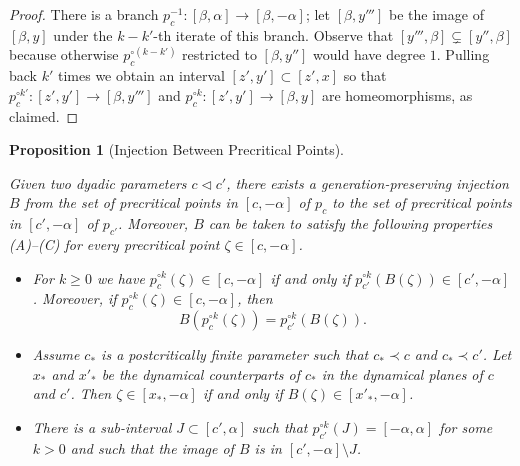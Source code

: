 \documentclass[12pt]{amsart}
\newcommand{\0}{\texttt{0}}
\newcommand{\1}{\texttt{1}}
\newtheorem{proposition}[theorem]{Proposition}
\theoremstyle{definition}
\numberwithin{equation}{section}
\newcommand{\lineclear}{\rule{0pt}{2pt}\newline}
\begin{document}
\begin{proof}
There is a branch $p_c^{-1}\colon[\beta,\alpha]\to[\beta,-\alpha]$; let $[\beta,y''']$ be the image of $[\beta,y]$ under the $k-k'$-th iterate of this branch. 
Observe that $[y''',\beta]\subsetneq[y'',\beta]$  because otherwise $p_c^{\circ (k-k')}$ restricted to $[\beta,y'']$ would have degree $1$. Pulling back $k'$ times we obtain an interval $[z',y']\subset[z',x]$ so that $p_c^{\circ k'}\colon [z',y']\to[\beta,y''']$ and $p_c^{\circ k}\colon[z',y']\to[\beta,y]$ are homeomorphisms, as claimed.
\end{proof}



\begin{proposition}[Injection Between Precritical Points]
\label{Prop:InjectionPrecritical} \lineclear
Given two dyadic parameters $c\lhd c'$, there exists a generation-preserving injection $B$ from the set of precritical points in $[c,-\alpha]$ of $p_c$ to the set of precritical points in $[c',-\alpha]$ of $p_{c'}$. Moreover, $B$ can be taken to satisfy the following properties (A)--(C) for every precritical point $\zeta\in [c,-\alpha]$. 

\begin{itemize}
\item[(A)] For $k\ge 0$ we have $p_c^{\circ k}(\zeta)\in [c,-\alpha]$  if and only if  $p_{c'}^{\circ k}(B(\zeta))\in [c',-\alpha]$. Moreover, if $p_c^{\circ k}(\zeta)\in [c,-\alpha]$, then  
\[
B(p_c^{\circ k}(\zeta))=p_{c'}^{\circ k}(B(\zeta)).
\]
\item[(B)] Assume $c_*$ is a postcritically finite parameter such that $c_* \prec c$ and $c_* \prec c'$. Let $x_*$ and $x'_*$ be the  dynamical counterparts of $c_*$ in the dynamical planes of $c$ and $c'$. Then $\zeta\in [x_*,-\alpha]$ if and only if $B(\zeta)\in [x'_*,-\alpha]$.
\item[(C)] There is a sub-interval $J\subset [c', \alpha]$ such that $p^{\circ k }_{c'}(J)=[-\alpha, \alpha ]$ for some $k>0$ and such that the image of $B$ is in $[c',-\alpha]\setminus J$.
\end{itemize}
\end{proposition}
\end{document}
